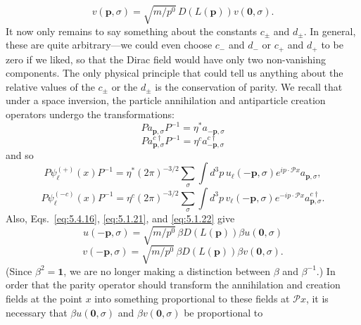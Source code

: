 \begin{equation}
v(\mathbf p,\sigma)=\sqrt{m/p^0}\,D(L(\mathbf p))v(\mathbf0,\sigma).
\tag{5.5.7}\label{eq:5.5.7}
\end{equation}
It now only remains to say something about the constants $c_\pm$ and $d_\pm$.
In general, these are quite arbitrary---we could even choose $c_-$ and $d_-$
or $c_+$ and $d_+$ to be zero if we liked, so that the Dirac field would have
only two non-vanishing components. The only physical principle that could tell
us anything about the relative values of the $c_\pm$ or the $d_\pm$ is the
conservation of parity. We recall that under a space inversion, the particle
annihilation and antiparticle creation operators undergo the transformations:
\begin{equation}
P a_{\mathbf p,\sigma}P^{-1}=\eta^*a_{-\mathbf p,\sigma}
\tag{5.5.8}\label{eq:5.5.8}
\end{equation}
\begin{equation}
P a^{c\dagger}_{\mathbf p,\sigma}P^{-1}
=\eta^c a^{c\dagger}_{-\mathbf p,\sigma}
\tag{5.5.9}\label{eq:5.5.9}
\end{equation}
and so
\begin{equation}
P\psi_\ell^{(+)}(x)P^{-1}=\eta^*(2\pi)^{-3/2}
\sum_\sigma\int d^3p\,u_\ell(-\mathbf p,\sigma)
e^{ip\cdot\mathcal P x}a_{\mathbf p,\sigma},
\tag{5.5.10}\label{eq:5.5.10}
\end{equation}
\begin{equation}
P\psi_\ell^{(-c)}(x)P^{-1}=\eta^c(2\pi)^{-3/2}
\sum_\sigma\int d^3p\,v_\ell(-\mathbf p,\sigma)
e^{-ip\cdot\mathcal P x}a^{c\dagger}_{\mathbf p,\sigma}.
\tag{5.5.11}\label{eq:5.5.11}
\end{equation}
Also, Eqs.~\eqref{eq:5.4.16}, \eqref{eq:5.1.21}, and \eqref{eq:5.1.22} give
\begin{equation}
u(-\mathbf p,\sigma)=\sqrt{m/p^0}\,\beta D(L(\mathbf p))\beta u(\mathbf0,\sigma)
\tag{5.5.12}\label{eq:5.5.12}
\end{equation}
\begin{equation}
v(-\mathbf p,\sigma)=\sqrt{m/p^0}\,\beta D(L(\mathbf p))\beta v(\mathbf0,\sigma).
\tag{5.5.13}\label{eq:5.5.13}
\end{equation}
(Since $\beta^2=\mathbf{1}$, we are no longer making a distinction between
$\beta$ and $\beta^{-1}$.) In order that the parity operator should transform
the annihilation and creation fields at the point $x$ into something
proportional to these fields at $\mathcal P x$, it is necessary that
$\beta u(\mathbf0,\sigma)$ and $\beta v(\mathbf0,\sigma)$ be proportional to
